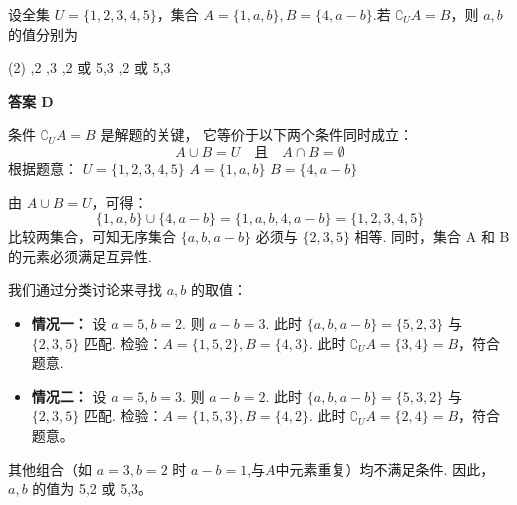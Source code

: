 \begin{choice}[topic={集合的补集与互异性}]
设全集 $U=\{1,2,3,4,5\}$，集合 $A=\{1,a,b\}, B=\{4, a-b\}$.若 $\complement_U A = B$，则 $a,b$ 的值分别为
\begin{tasks}(2)
	,2
	,3
	,2 或 5,3
	,2 或 5,3
\end{tasks}
\end{choice}
\begin{choice-sol}
\textbf{答案 D}

条件 $\complement_U A = B$ 是解题的关键，
它等价于以下两个条件同时成立：
\[ A \cup B = U \quad \text{且} \quad A \cap B = \emptyset \]
根据题意：
$U=\{1,2,3,4,5\}$
$A=\{1,a,b\}$
$B=\{4, a-b\}$

由 $A \cup B = U$，可得：
\[ \{1,a,b\} \cup \{4, a-b\} = \{1, a, b, 4, a-b\} = \{1,2,3,4,5\} \]
比较两集合，可知无序集合 $\{a, b, a-b\}$ 必须与 $\{2,3,5\}$ 相等.
同时，集合 A 和 B 的元素必须满足互异性.

我们通过分类讨论来寻找 $a,b$ 的取值：
\begin{itemize}
	\item \textbf{情况一：} 设 $a=5, b=2$.
	则 $a-b = 3$.
	此时 $\{a,b,a-b\} = \{5,2,3\}$ 与 $\{2,3,5\}$ 匹配.
	检验：$A=\{1,5,2\}, B=\{4,3\}$.
	此时 $\complement_U A = \{3,4\}=B$，符合题意.
	\item \textbf{情况二：} 设 $a=5, b=3$.
	则 $a-b = 2$.
	此时 $\{a,b,a-b\} = \{5,3,2\}$ 与 $\{2,3,5\}$ 匹配.
	检验：$A=\{1,5,3\}, B=\{4,2\}$.
	此时 $\complement_U A = \{2,4\}=B$，符合题意。
\end{itemize}
其他组合（如 $a=3,b=2$ 时 $a-b=1$,与$A$中元素重复）均不满足条件.
因此，$a,b$ 的值为 5,2 或 5,3。
\end{choice-sol}
